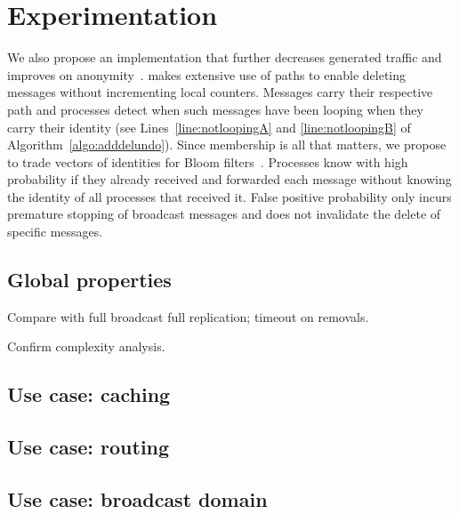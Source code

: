 
\section{Experimentation}
\label{sec:experimentation}

We also propose an implementation that further decreases generated
traffic and improves on anonymity~\cite{whitaker2002forwarding}.
\NAME makes extensive use of paths to enable deleting messages without
incrementing local counters. Messages carry their respective path and
processes detect when such messages have been looping when they carry
their identity (see Lines~\ref{line:notloopingA} and
\ref{line:notloopingB} of Algorithm~\ref{algo:adddelundo}). Since
membership is all that matters, we propose to trade vectors of
identities for Bloom filters~\cite{almeida2007scalable}. Processes
know with high probability if they already received and forwarded each
message without knowing the identity of all processes that received
it.  False positive probability only incurs premature stopping of
broadcast messages and does not invalidate the delete of specific
messages.

\subsection{Global properties}

Compare with full broadcast full replication; timeout on removals.

Confirm complexity analysis.

\subsection{Use case: caching}

\subsection{Use case: routing}

\subsection{Use case: broadcast domain}

\subsection{}

